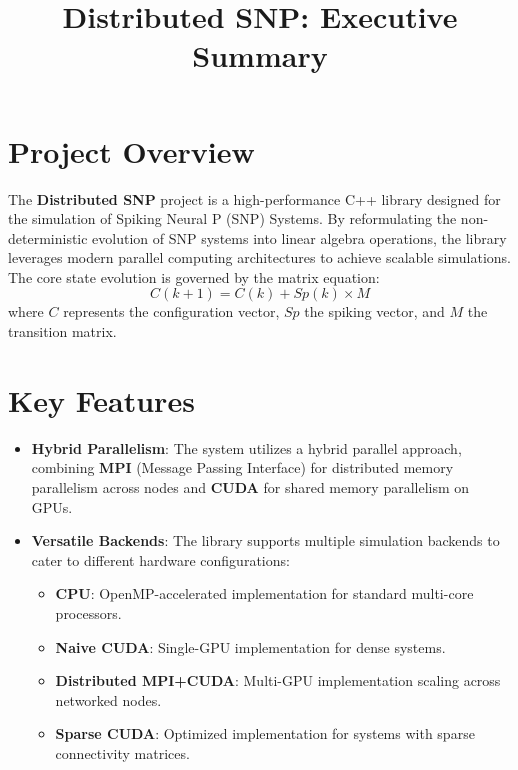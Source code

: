 \documentclass[twocolumn]{article}
\title{\textbf{Distributed SNP: Executive Summary}}
\author{}
\date{}
\begin{document}
\maketitle

\section*{Project Overview}
The \textbf{Distributed SNP} project is a high-performance C++ library designed for the simulation of Spiking Neural P (SNP) Systems. By reformulating the non-deterministic evolution of SNP systems into linear algebra operations, the library leverages modern parallel computing architectures to achieve scalable simulations. The core state evolution is governed by the matrix equation:
\[ C(k+1) = C(k) + Sp(k) \times M \]
where $C$ represents the configuration vector, $Sp$ the spiking vector, and $M$ the transition matrix.

\section*{Key Features}
\begin{itemize}
    \item \textbf{Hybrid Parallelism}: The system utilizes a hybrid parallel approach, combining \textbf{MPI} (Message Passing Interface) for distributed memory parallelism across nodes and \textbf{CUDA} for shared memory parallelism on GPUs.
    \item \textbf{Versatile Backends}: The library supports multiple simulation backends to cater to different hardware configurations:
    \begin{itemize}
        \item \textbf{CPU}: OpenMP-accelerated implementation for standard multi-core processors.
        \item \textbf{Naive CUDA}: Single-GPU implementation for dense systems.
        \item \textbf{Distributed MPI+CUDA}: Multi-GPU implementation scaling across networked nodes.
        \item \textbf{Sparse CUDA}: Optimized implementation for systems with sparse connectivity matrices.
    \end{itemize}
\end{itemize}
\end{document}
